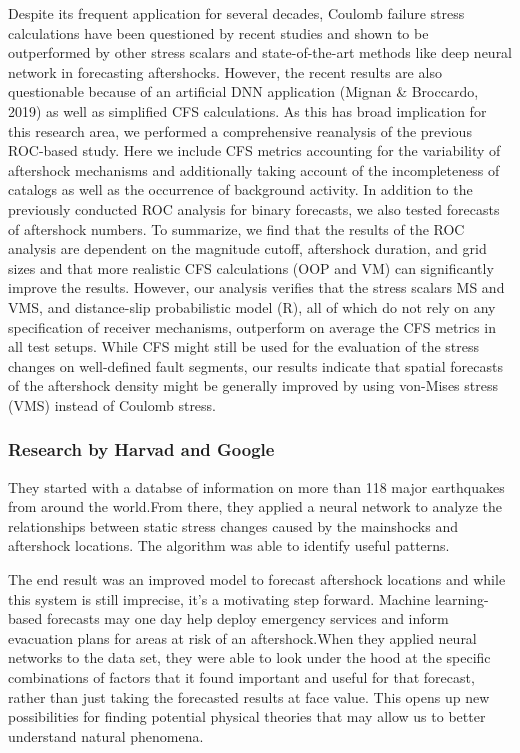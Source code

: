 \documentclass[journal,transmag]{IEEEtran}
\begin{document}
\par Despite its frequent application for several decades, Coulomb failure stress calculations have been questioned by recent studies and shown to be outperformed by other stress scalars and state-of-the-art methods like deep neural network in forecasting aftershocks. However, the recent results are also questionable because of an artificial DNN application (Mignan \& Broccardo, 2019) as well as simplified CFS calculations. As this has broad implication for this research area, we performed a comprehensive reanalysis of the previous ROC-based study. Here we include CFS metrics accounting for the variability of aftershock mechanisms and additionally taking account of the incompleteness of catalogs as well as the occurrence of background activity. In addition to the previously conducted ROC analysis for binary forecasts, we also tested forecasts of aftershock numbers. To summarize, we find that the results of the ROC analysis are dependent on the magnitude cutoff, aftershock duration, and grid sizes and that more realistic CFS calculations (OOP and VM) can significantly improve the results. However, our analysis verifies that the stress scalars MS and VMS, and distance-slip probabilistic model (R), all of which do not rely on any specification of receiver mechanisms, outperform on average the CFS metrics in all test setups. While CFS might still be used for the evaluation of the stress changes on well-defined fault segments, our results indicate that spatial forecasts of the aftershock density might be generally improved by using von-Mises stress (VMS) instead of Coulomb stress.

\vspace{0.5em}
\subsubsection{Research by Harvad and Google}
\vspace{0.5em}

\par They  started with a databse of information on more than 118 major earthquakes from around the world.From there, they applied a neural network to analyze the relationships between static stress changes caused by the mainshocks and aftershock locations. The algorithm was able to identify useful patterns.
\par The end result was an improved model to forecast aftershock locations and while this system is still imprecise, it's a motivating step forward. Machine learning-based forecasts may one day help deploy emergency services and inform evacuation plans for areas at risk of an aftershock.When they applied neural networks to the data set, they were able to look under the hood at the specific combinations of factors that it found important and useful for that forecast, rather than just taking the forecasted results at face value. This opens up new possibilities for finding potential physical theories that may allow us to better understand natural phenomena.
\end{document}
